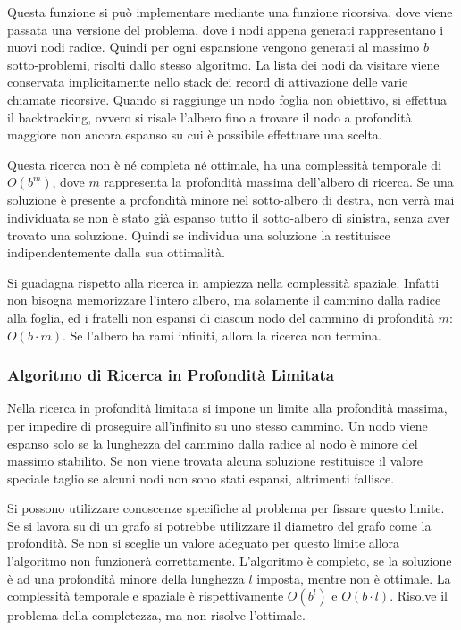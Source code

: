 \documentclass{article}
\numberwithin{equation}{subsection}
\begin{document}
Questa funzione si può implementare mediante una funzione ricorsiva, dove viene 
passata una versione del problema, dove i nodi appena generati rappresentano i nuovi 
nodi radice. Quindi per ogni espansione vengono generati al massimo $b$ sotto-problemi, risolti 
dallo stesso algoritmo. La lista dei nodi da visitare viene conservata implicitamente nello 
stack dei record di attivazione delle varie chiamate ricorsive. Quando si raggiunge un nodo 
foglia non obiettivo, si effettua il backtracking, ovvero si risale l'albero fino a trovare il 
nodo a profondità maggiore non ancora espanso su cui è possibile effettuare una scelta. 

Questa ricerca non è né completa né ottimale, ha una complessità temporale di $O(b^m)$, dove 
$m$ rappresenta la profondità massima dell'albero di ricerca. Se una soluzione è presente a 
profondità minore nel sotto-albero di destra, non verrà mai individuata se non è stato già 
espanso tutto il sotto-albero di sinistra, senza aver trovato una soluzione. Quindi se individua 
una soluzione la restituisce indipendentemente dalla sua ottimalità. 

Si guadagna rispetto alla ricerca in ampiezza nella complessità spaziale. Infatti non bisogna 
memorizzare l'intero albero, ma solamente il cammino dalla radice alla foglia, ed i 
fratelli non espansi di ciascun nodo del cammino di profondità $m$: $O(b\cdot m)$. Se 
l'albero ha rami infiniti, allora la ricerca non termina. 

\subsubsection{Algoritmo di Ricerca in Profondità Limitata}

Nella ricerca in profondità limitata si impone un limite alla profondità massima, per impedire 
di proseguire all'infinito su uno stesso cammino. Un nodo viene espanso solo se la lunghezza 
del cammino dalla radice al nodo è minore del massimo stabilito. Se non viene trovata 
alcuna soluzione restituisce il valore speciale taglio se alcuni nodi non sono stati espansi, 
altrimenti fallisce. 

Si possono utilizzare conoscenze specifiche al problema per fissare questo limite. Se si 
lavora su di un grafo si potrebbe utilizzare il diametro del grafo come la profondità. Se non 
si sceglie un valore adeguato per questo limite allora l'algoritmo non funzionerà correttamente. 
L'algoritmo è completo, se la soluzione è ad una profondità minore della lunghezza $l$ imposta, 
mentre non è ottimale. La complessità temporale e spaziale è rispettivamente $O(b^l)$ e $O(b\cdot l)$. 
Risolve il problema della completezza, ma non risolve l'ottimale.  
\end{document}
